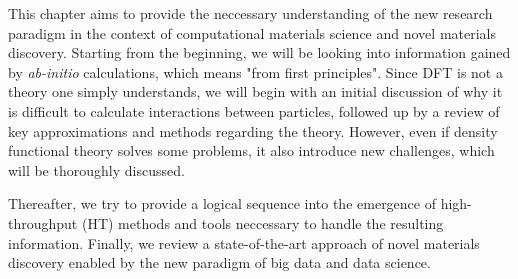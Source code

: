 This chapter aims to provide the neccessary understanding of the new research paradigm in the context of computational materials science and novel materials discovery. Starting from the beginning, we will be looking into information gained by \textit{ab-initio} calculations, which means "from first principles". %
Since DFT is not a theory one simply understands, we will begin with an initial discussion of why it is difficult to calculate interactions between particles, followed up by a review of key approximations and methods regarding the theory. However, even if density functional theory solves some problems, it also introduce new challenges, which will be thoroughly discussed.

Thereafter, we try to provide a logical sequence into the emergence of high-throughput (HT) methods and tools neccessary to handle the resulting information. Finally, we review a state-of-the-art approach of novel materials discovery enabled by the new paradigm of big data and data science.

